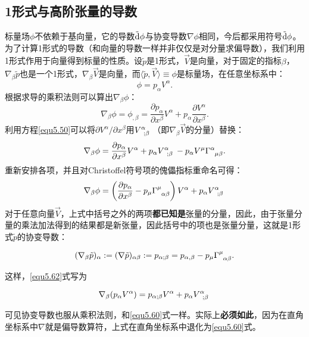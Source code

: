 \subsection*{1形式与高阶张量的导数}
标量场$\phi$不依赖于基向量，它的导数$\tilde{\mathrm{d}} \phi$与协变导数$\nabla \phi$相同，今后都采用符号$\tilde{\mathrm{d}} \phi$。为了计算1形式的导数（和向量的导数一样并非仅仅是对分量求偏导数），我们利用1形式作用于向量得到标量的性质。设$\tilde{p}$是1形式，$\vec{V}$是向量，对于固定的指标$\beta$，$\nabla_\beta \tilde{p}$也是一个1形式，$\nabla_\beta \vec{V}$是向量，而$\langle \tilde{p}, \vec{V} \rangle \equiv \phi$是标量场，在任意坐标系中：
\begin{equation}
    \phi = p_\alpha V^\alpha.
\label{equ5.59}
\end{equation}
根据求导的乘积法则可以算出$\nabla_\beta \phi$：
\begin{equation}
    \nabla_\beta \phi = \phi_{, \beta} = \frac{\partial p_{\alpha}}{\partial x^\beta} V^\alpha + p_\alpha \frac{\partial V^\alpha}{\partial x^\beta}.
\label{equ5.60}
\end{equation}
利用方程\eqref{equ5.50}可以将$\partial V^\alpha / \partial x^\beta$用$V\indices{^\alpha_{; \beta}}$（即$\nabla_\beta \vec{V}$的分量）替换：
\begin{equation}
    \nabla_\beta \phi = \frac{\partial p_\alpha}{\partial x^\beta} V^\alpha + p_{\alpha} V\indices{^\alpha_{; \beta}} - p_\alpha V^\mu \Gamma\indices{^\alpha_{\mu \beta}}.
\label{equ5.61}
\end{equation}
重新安排各项，并且对Christoffel符号项的傀儡指标重命名可得：
\begin{equation}
    \nabla_\beta \phi = \left( \frac{\partial p_\alpha}{\partial x^\beta} - p_\mu \Gamma\indices{^\mu_{\alpha \beta}} \right) V^\alpha + p_\alpha V\indices{^\alpha_{; \beta}}
\label{equ5.62}
\end{equation}
对于任意向量$\vec{V}$，上式中括号之外的两项\textbf{都已知是}张量的分量，因此，由于张量分量的乘法加法得到的结果都是新张量，因此括号中的项也是张量分量，这就是1形式$\tilde{p}$的协变导数：
\begin{shaded}
\begin{equation}
    (\nabla_\beta \tilde{p})_\alpha := (\nabla \tilde{p})_{\alpha \beta} := p_{\alpha; \beta} = p_{\alpha, \beta} - p_\mu \Gamma\indices{^\mu_{\alpha \beta}}.
\label{equ5.63}
\end{equation}
\end{shaded}
这样，\eqref{equ5.62}式写为
\begin{shaded}
\begin{equation*}
    \nabla_\beta (p_\alpha V^\alpha) = p_{\alpha; \beta} V^\alpha + p_\alpha V\indices{^\alpha_{; \beta}}
\end{equation*}
\end{shaded}
可见协变导数也服从乘积法则，和\eqref{equ5.60}式一样。实际上\textbf{必须如此}，因为在直角坐标系中$\nabla$就是偏导数算符，上式在直角坐标系中退化为\eqref{equ5.60}式。


